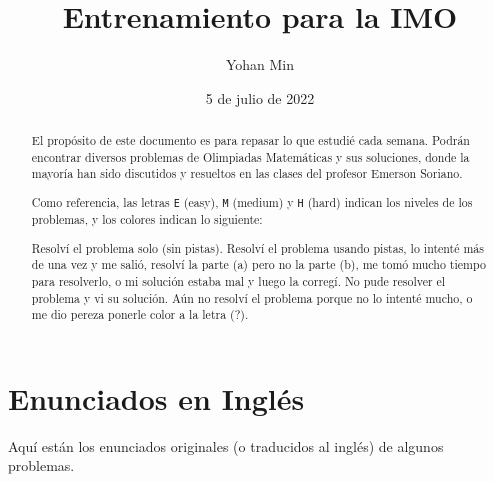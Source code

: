 \documentclass[11pt]{scrartcl}
\title{Entrenamiento para la IMO}
\author{Yohan Min}
\date{5 de julio de 2022}
\begin{document}
\maketitle

\begin{abstract}
  El propósito de este documento es para repasar lo que estudié cada semana.
  Podrán encontrar diversos problemas de Olimpiadas Matemáticas y sus
  soluciones, donde la mayoría han sido discutidos y resueltos en las clases del
  profesor Emerson Soriano.

  Como referencia, las letras \verb|E| (easy), \verb|M| (medium) y \verb|H|
  (hard) indican los niveles de los problemas, y los colores indican lo
  siguiente:
  \begin{description}[%
      labelwidth=\widthof{\texttt{aaaaa}}+1.2em,%
      leftmargin=\widthof{\texttt{aaaaa}a}+1.2em,%
      align=right%
    ]
     Resolví el problema solo (sin pistas).
     Resolví el problema usando pistas, lo intenté más de una
    vez y me salió, resolví la parte (a) pero no la parte (b), me tomó mucho
    tiempo para resolverlo, o mi solución estaba mal y luego la corregí.
     No pude resolver el problema y vi su solución.
     Aún no resolví el problema porque no lo intenté mucho, o
    me dio pereza ponerle color a la letra (?).
  \end{description}
\end{abstract}

\tableofcontents



















\section{Enunciados en Inglés}

Aquí están los enunciados originales (o traducidos al inglés) de algunos
problemas.

\makehints
\clearpage

\printbibliography
\end{document}
